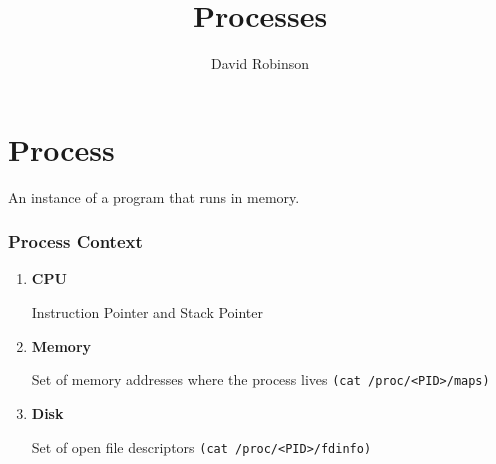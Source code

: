 \documentclass{article}
\title{Processes}
\author{David Robinson}
\date{}
\begin{document}
\maketitle

\section*{Process}
An instance of a program that runs in memory.

\subsubsection*{Process Context}

\begin{enumerate}
    \item \textbf{CPU}
    
    Instruction Pointer and Stack Pointer

    \item \textbf{Memory}
    
    Set of memory addresses where the process lives \verb|(cat /proc/<PID>/maps)|

    \item \textbf{Disk}
    
    Set of open file descriptors \verb|(cat /proc/<PID>/fdinfo)|
\end{enumerate}
\end{document}
